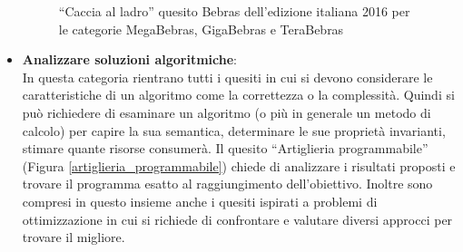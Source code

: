 \documentclass[12pt]{report}
\begin{document}
\begin{itemize}
	\begin{figure}[h]
		\centering
		\caption{``Caccia al ladro'' quesito Bebras dell'edizione italiana 2016 per le categorie MegaBebras, GigaBebras e TeraBebras}\label{2016-BE-02}
	\end{figure}
	
\bigskip
	\item \textbf{Analizzare soluzioni algoritmiche}: 
	\\
	In questa categoria rientrano tutti i quesiti in cui si devono considerare le caratteristiche di un algoritmo come la correttezza o la complessità. Quindi si può richiedere di esaminare un algoritmo (o più in generale un metodo di calcolo) per capire la sua semantica, determinare le sue proprietà invarianti, stimare quante risorse consumerà. 
	Il quesito ``Artiglieria programmabile'' (Figura \ref{artiglieria_programmabile}) chiede di analizzare i risultati proposti e trovare il programma esatto al raggiungimento dell'obiettivo. 
	Inoltre sono compresi in questo insieme anche i quesiti ispirati a problemi di ottimizzazione in cui si richiede di confrontare e valutare diversi approcci per trovare il migliore.
	

\end{itemize}
\end{document}
